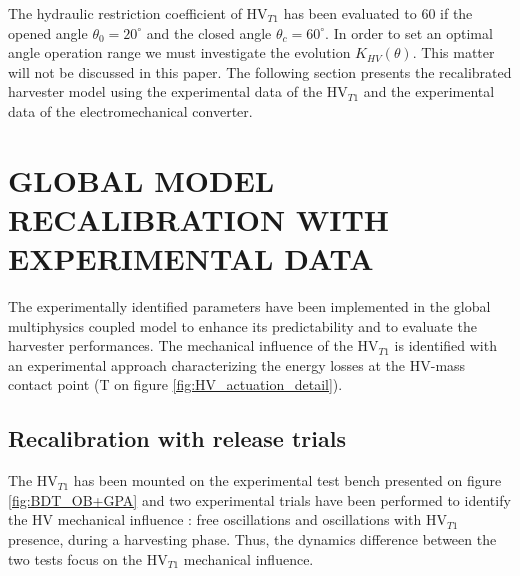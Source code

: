 \documentclass[3p,twocolumn,preprint]{elsarticle}
\begin{document}
The hydraulic restriction coefficient of HV$_{T1}$ has been evaluated to 60 if the opened angle $\theta_0=20^{\circ}$ and the closed angle $\theta_c = 60^{\circ}$. In order to set an optimal angle operation range we must investigate the evolution $K_{HV}(\theta)$. This matter will not be discussed in this paper. The following section presents the recalibrated harvester model using the experimental data of the HV$_{T1}$ and the experimental data of the electromechanical converter.

\section{GLOBAL MODEL RECALIBRATION WITH \mbox{EXPERIMENTAL} DATA}
\label{sec:MODEL RECALIBRATION WITH EXPERIMENTAL DATA}

The experimentally identified parameters have been implemented in the global multiphysics coupled model to enhance its predictability and to evaluate the harvester performances. The mechanical influence of the HV$_{T1}$ is identified with an experimental approach characterizing the energy losses at the HV-mass contact point (T on figure \ref{fig:HV_actuation_detail}). 

	\subsection{Recalibration with release trials}
The HV$_{T1}$ has been mounted on the experimental test bench presented on figure \ref{fig:BDT_OB+GPA} and two experimental trials have been performed to identify the HV mechanical influence : free oscillations and oscillations with HV$_{T1}$ presence, during a harvesting phase. Thus, the dynamics difference between the two tests focus on the HV$_{T1}$ mechanical influence. 
\end{document}
